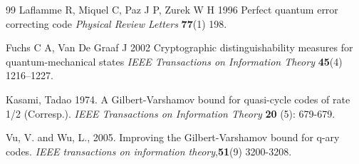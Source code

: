 \documentclass{iopjournal}
\theoremstyle{thmstyleone}%
\theoremstyle{thmstyletwo}%
\theoremstyle{thmstylethree}%
\begin{document}
\begin{thebibliography}{99}
Laflamme R, Miquel C, Paz J P, Zurek W H 1996 Perfect quantum error correcting code \emph{Physical Review Letters} \textbf{77}(1) 198.

Fuchs C A, Van De Graaf J 2002 Cryptographic distinguishability measures for quantum-mechanical states \emph{IEEE Transactions on Information Theory} \textbf{45}(4) 1216–1227.

Kasami, Tadao 1974. A Gilbert-Varshamov bound for quasi-cycle codes of rate 1/2 (Corresp.).\emph{ IEEE Transactions on Information Theory} \textbf{20} (5): 679-679.

Vu, V. and Wu, L., 2005. Improving the Gilbert-Varshamov bound for q-ary codes. \emph{IEEE transactions on information theory},\textbf{51}(9) 3200-3208.





\end{thebibliography}





\end{document}
